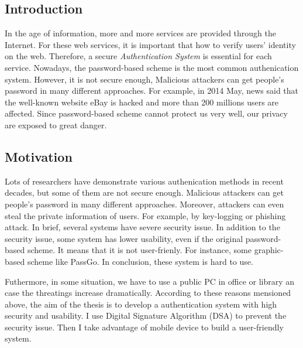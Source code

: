 
\begin{CJK}{Bg5}{bsmi}



\chapter{Introduction}

In the age of information, more and more services are provided through the Internet. For these web services, it is important that how to verify users' identity on the web. Therefore, a secure \emph{Authentication System} is essential for each service. Nowadays, the password-based scheme is the most common authenication system. However, it is not secure enough\cite{password-security}, Malicious attackers can get people's password in many different approaches. For example, in 2014 May, news said that the well-known website eBay is hacked and more than 200 millions users are affected\cite{ebay-hack}. Since password-based scheme cannot protect us very well, our privacy are exposed to great danger.

\section{Motivation}

Lots of researchers have demonstrate various authenication methods in recent decades, but some of them are not secure enough. Malicious attackers can get people's password in many different approaches. Moreover, attackers can even steal the private information of users. For example, by key-logging or phishing attack. In brief, several systems have severe security issue. In addition to the security issue, some system has lower usability, even if the original password-based scheme\cite{password-usability}. It means that it is not user-frienly. For instance, some graphic-based scheme like PassGo\cite{passgo}. In conclusion, these system is hard to use.

Futhermore, in some situation, we have to use a public PC in office or library an case the threatings increase dramatically. According to these reasons mensioned above, the aim of the thesis is to develop a authentication system with high security and usability. I use Digital Signature Algorithm (DSA) to prevent the security issue. Then I take advantage of mobile device to build a user-friendly system.


\end{CJK}
